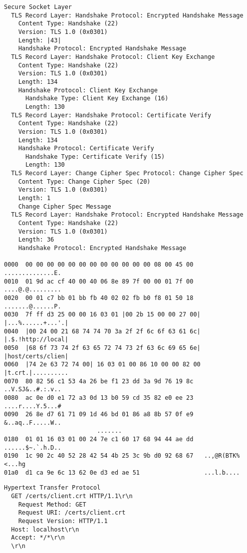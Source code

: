 \begin{lstlisting}[caption={Mensagem \tlsHsCu}]
Secure Socket Layer 
  TLS Record Layer: Handshake Protocol: Encrypted Handshake Message 
    Content Type: Handshake (22) 
    Version: TLS 1.0 (0x0301) 
    Length: |43|
    Handshake Protocol: Encrypted Handshake Message 
  TLS Record Layer: Handshake Protocol: Client Key Exchange 
    Content Type: Handshake (22) 
    Version: TLS 1.0 (0x0301) 
    Length: 134 
    Handshake Protocol: Client Key Exchange 
      Handshake Type: Client Key Exchange (16) 
      Length: 130 
  TLS Record Layer: Handshake Protocol: Certificate Verify 
    Content Type: Handshake (22) 
    Version: TLS 1.0 (0x0301) 
    Length: 134 
    Handshake Protocol: Certificate Verify 
      Handshake Type: Certificate Verify (15) 
      Length: 130 
  TLS Record Layer: Change Cipher Spec Protocol: Change Cipher Spec 
    Content Type: Change Cipher Spec (20) 
    Version: TLS 1.0 (0x0301) 
    Length: 1 
    Change Cipher Spec Message 
  TLS Record Layer: Handshake Protocol: Encrypted Handshake Message 
    Content Type: Handshake (22) 
    Version: TLS 1.0 (0x0301) 
    Length: 36 
    Handshake Protocol: Encrypted Handshake Message 
 
0000  00 00 00 00 00 00 00 00 00 00 00 00 08 00 45 00   ..............E. 
0010  01 9d ac cf 40 00 40 06 8e 89 7f 00 00 01 7f 00   ....@.@......... 
0020  00 01 c7 bb 01 bb fb 40 02 02 fb b0 f8 01 50 18   .......@......P. 
0030  7f ff d3 25 00 00 16 03 01 |00 2b 15 00 00 27 00|   |...%......+...'.|
0040  |00 24 00 21 68 74 74 70 3a 2f 2f 6c 6f 63 61 6c|   |.$.!http://local|
0050  |68 6f 73 74 2f 63 65 72 74 73 2f 63 6c 69 65 6e|   |host/certs/clien|
0060  |74 2e 63 72 74 00| 16 03 01 00 86 10 00 00 82 00   |t.crt.|..........
0070  80 82 56 c1 53 4a 26 be f1 23 dd 3a 9d 76 19 8c   ..V.SJ&..#.:.v..
0080  ac 0e d0 e1 72 a3 0d 13 b0 59 cd 35 82 e0 ee 23   ....r....Y.5...#
0090  26 8e d7 61 71 09 1d 46 bd 01 86 a8 8b 57 0f e9   &..aq..F.....W..
                          ....... 
0180  01 01 16 03 01 00 24 7e c1 60 17 68 94 44 ae dd   ......$~.`.h.D..
0190  1c 90 2c 40 52 28 42 54 4b 25 3c 9b d0 92 68 67   ..,@R(BTK%<...hg
01a0  d1 ca 9e 6c 13 62 0e d3 ed ae 51                  ...l.b....
\end{lstlisting}

\begin{lstlisting}[caption={Solicitação HTTP enviada pela aplicação \texttt{s\_server}}]
Hypertext Transfer Protocol 
  GET /certs/client.crt HTTP/1.1\r\n 
    Request Method: GET 
    Request URI: /certs/client.crt 
    Request Version: HTTP/1.1 
  Host: localhost\r\n 
  Accept: */*\r\n 
  \r\n
\end{lstlisting}

